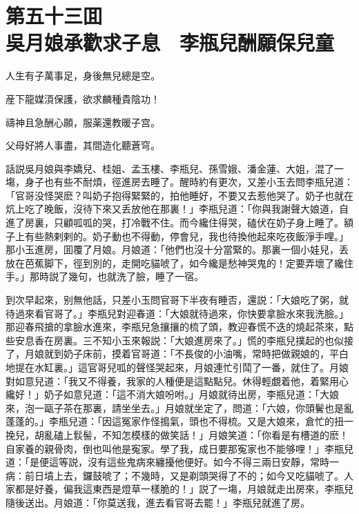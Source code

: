 
\chapter*{第五十三囬　\\吳月娘承歡求子息　李瓶兒酬願保兒童}


\begin{myquote}
人生有子萬事足，身後無兒總是空。

産下龍媒湏保護，欲求麟種貴陰功！

禱神且急酬心願，服薬還教暖子宫。

父母好將人事盡，其間造化聽蒼穹。
\end{myquote}

話説吳月娘與李嬌兒、桂姐、孟玉樓、李瓶兒、孫雪娥、潘金蓮、大姐，混了一塲，身子也有些不耐煩，徑進房去睡了。醒時約有更次，又差小玉去問李瓶兒道：「官哥没怪哭麽？叫奶子抱得緊緊的，拍他睡好，不要又去惹他哭了。奶子也就在炕上吃了晚飯，沒待下來又丢放他在那裏！」李瓶兒道：「你與我謝聲大娘道，自進了房裏，只顧呱呱的哭，打冷戰不住。而今纔住得哭，磕伏在奶子身上睡了。額子上有些熱剌剌的。奶子動也不得動，停會兒，我也待換他起來吃夜飯淨手哩。」那小玉進房，囬覆了月娘。月娘道：「他們也沒十分當緊的。那裏一個小娃兒，丢放在芭蕉脚下，徑到別的，走開吃貓唬了，如今纔是愁神哭鬼的！定要弄壞了纔住手。」那時説了幾句，也就洗了臉，睡了一宿。

到次早起來，别無他話，只差小玉問官哥下半夜有睡否，還説：「大娘吃了粥，就待過來看官哥了。」李瓶兒對迎春道：「大娘就待過來，你快要拿臉水來我洗臉。」那迎春飛搶的拿臉水進來，李瓶兒急攘攘的梳了頭，教迎春慌不迭的燒起茶來，點些安息香在房裏。三不知小玉來報説：「大娘進房來了。」慌的李瓶兒撲起的也似接了，月娘就到奶子床前，摸着官哥道：「不長俊的小油嘴，常時把做親娘的，平白地提在水缸裏。」這官哥兒呱的聲怪哭起來，月娘連忙引鬦了一番，就住了。月娘對如意兒道：「我又不得養，我家的人種便是這點點兒。休得輕覷着他，着緊用心纔好！」奶子如意兒道：「這不消大娘吩咐。」月娘就待出房，李瓶兒道：「大娘來，泡一甌子茶在那裏，請坐坐去。」月娘就坐定了，問道：「六娘，你頭鬢也是亂蓬蓬的。」李瓶兒道：「因這冤家作怪搗氣，頭也不得梳。又是大娘來，倉忙的扭一挽兒，胡亂磕上䯼髻，不知怎模樣的做笑話！」月娘笑道：「你看是有槽道的麽！自家養的親骨肉，倒也叫他是寃家。學了我，成日要那寃家也不能够哩！」李瓶兒道：「是便這等説，沒有這些鬼病來纏擾他便好。如今不得三兩日安靜，常時一病：前日墳上去，鑼鼓唬了；不幾時，又是剃頭哭得了不的；如今又吃貓唬了。人家都是好養，偏我這東西是燈草一樣脆的！」説了一塲，月娘就走出房來，李瓶兒隨後送出。月娘道：「你莫送我，進去看官哥去罷！」李瓶兒就進了房。

